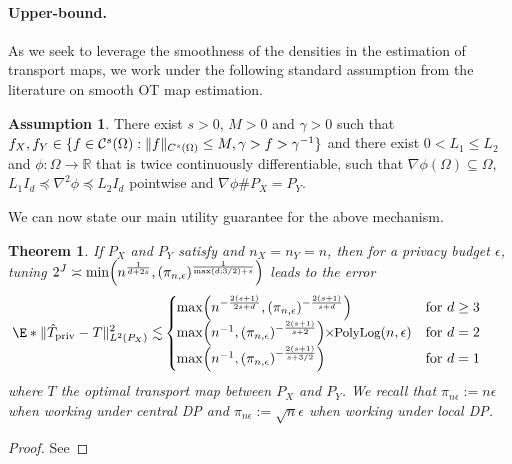 \documentclass{article}
\newcommand{\R}{\mathbb{R}}
\newcommand{\1}{\mathds{1}}
\DeclarePairedDelimiter{\paren}{\lparen}{\rparen}
\DeclarePairedDelimiter{\braces}{\lbrace}{\rbrace}
\theoremstyle{plain}
\newtheorem{theorem}{Theorem}[section]
\theoremstyle{definition}
\newtheorem{assumption}{Assumption}
\theoremstyle{remark}
\begin{document}
\paragraph{Upper-bound.}
As we seek to leverage the smoothness of the densities in the estimation of transport maps, we work under the following standard assumption from the literature on smooth OT map estimation.


\begin{assumption}
\label{ass:regularity_transport_problem}
    There exist $s > 0$, $M>0$ and $\gamma >0$ such that $f_X, f_Y \in \braces{f \in \mathcal{C}^s(\Omega): \| f\|_{C^s(\Omega)} \leq M, \gamma > f > \gamma^{-1} }$ and there exist $0 <L_1 \leq L_2$ and $\phi : \Omega \rightarrow \R$ that is twice continuously differentiable, such that $\nabla \phi (\Omega) \subseteq \Omega$, $ L_1 I_d \preceq\nabla^2 \phi \preceq L_2 I_d $  pointwise and $\nabla \phi \# P_X = P_Y$.
\end{assumption}

We can now state our main utility guarantee for the above mechanism.

\begin{theorem}
\label{th:main_rate}
    If $P_X$ and $P_Y$ satisfy  and $n_X = n_Y = n$, then for a privacy budget $\epsilon$, tuning
    $ 2^J \asymp \min \paren*{n^{\frac{1}{d + 2s}}, (\pi_{n,\epsilon})^{\frac{1}{\max(d;3/2)+s}}} $
 leads to the error
\begin{align*}
   \E*{\| \hat{T}_{\textrm{priv}} - T \|^2_{L^2({P_X})}}
    \lesssim 
    &
    \left\{
    \hspace*{-0.2cm}\begin{array}{ll}
       \max \paren*{n^{- \frac{2 (s + 1)}{ 2 s + d}}, (\pi_{n,\epsilon})^{- \frac{2 (s + 1)}{ s + d}}}   &  \text{for $d\geq 3 $}\\
            \max \paren*{n^{- 1}, (\pi_{n,\epsilon})^{- \frac{2 (s + 1)}{ s + 2}}} \hspace*{-0.1cm}  \times \hspace*{-0.1cm} \textrm{\small PolyLog}(n, \epsilon) & \text{for $d = 2 $ }\\
     \max \paren*{n^{- 1 }, (\pi_{n,\epsilon})^{- \frac{2 (s + 1)}{ s + 3/2}}} &  \text{for $d = 1 $ }
    \end{array} \right.
\end{align*}
    where $T$ the optimal transport map between $P_X$ and $P_Y$. We recall that $\pi_{n \epsilon} := n \epsilon$ when working under central DP and $\pi_{n \epsilon} := \sqrt{n} \epsilon$ when working under local DP.
\end{theorem}
\begin{proof}
    See 
\end{proof}
\end{document}
